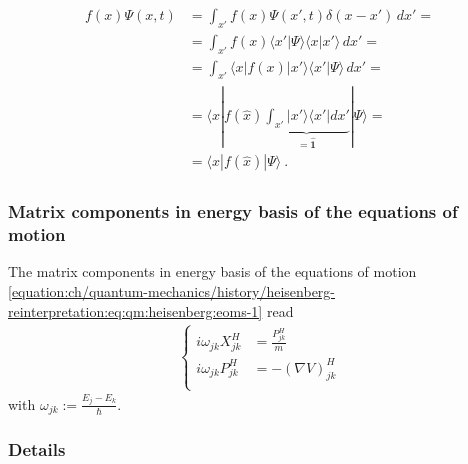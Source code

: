 \documentclass[letterpaper,10pt,english]{jupyterBook}
\begin{document}
\begin{equation*}
\begin{split}\begin{aligned}
  f(x) \Psi(x,t)
  & = \int_{x'} f(x) \Psi(x', t) \delta(x-x') \, dx' = \\
  & = \int_{x'} f(x) \langle x' | \Psi \rangle \langle x | x' \rangle \, dx' = \\
  & = \int_{x'} \langle x | f(x) | x' \rangle \langle x' | \Psi \rangle \, dx' = \\
  & = \langle x | f \left(\hat{x}\right) \underbrace{\int_{x'} | x' \rangle \langle x' | dx'}_{=\hat{\mathbf{1}}} | \Psi \rangle = \\
  & = \langle x | f\left(\hat{x}\right) | \Psi \rangle \ .
\end{aligned}\end{split}
\end{equation*}

\subsubsection{Matrix components in energy basis of the equations of motion}
\label{\detokenize{ch/quantum-mechanics/history/heisenberg-reinterpretation:matrix-components-in-energy-basis-of-the-equations-of-motion}}\label{\detokenize{ch/quantum-mechanics/history/heisenberg-reinterpretation:quantum-mechanics-history-heisenberg-reinterpretation-eoms-matrix-components}}
\sphinxAtStartPar
The matrix components in energy basis of the equations of motion \eqref{equation:ch/quantum-mechanics/history/heisenberg-reinterpretation:eq:qm:heisenberg:eoms-1} read
\begin{equation}\label{equation:ch/quantum-mechanics/history/heisenberg-reinterpretation:eq:qm:heisenberg:eoms-2}
\begin{split}\left\{
\begin{aligned}
 i \omega_{jk} X_{jk}^H & = \frac{P_{jk}^H}{m} \\
 i \omega_{jk} P_{jk}^H & = - \left( \nabla V \right)^{H}_{jk} \\
\end{aligned}
\right.\end{split}
\end{equation}
\sphinxAtStartPar
with \(\omega_{jk} := \frac{E_j - E_k}{\hbar}\).
\subsubsection*{Details}
\end{document}
